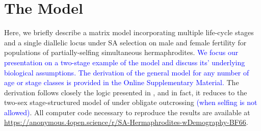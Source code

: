\documentclass[11pt]{article}
\begin{document}




\section*{The Model}

Here, we briefly describe a matrix model incorporating multiple life-cycle stages and a single diallelic locus under SA selection on male and female fertility for populations of partially-selfing simultaneous hermaphrodites. \textcolor{blue}{We focus our presentation on a two-stage example of the model and discuss its' underlying biological assumptions. The derivation of the general model for any number of age or stage classes is provided in the Online Supplementary Material.} The derivation follows closely the logic presented in \citet{deVriesCaswell2019a, deVriesCaswell2019b}, and in fact, it reduces to the two-sex stage-structured model of \citet{deVriesCaswell2019a} under obligate outcrossing \textcolor{blue}{(when selfing is not allowed)}. All computer code necessary to reproduce the results are available at \url{https://anonymous.4open.science/r/SA-Hermaphrodites-wDemography-BF66}.%
\end{document}
